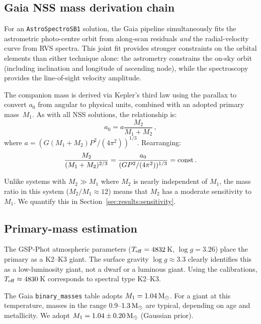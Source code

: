 \documentclass[usenatbib,fleqn]{mnras}
\newcommand{\Msun}{{\rm M}_\odot}
\begin{document}
\subsection{Gaia NSS mass derivation chain}
\label{sec:methods:nss}

For an \texttt{AstroSpectroSB1} solution, the Gaia pipeline
simultaneously fits the astrometric photo-centre orbit from
along-scan residuals \emph{and} the radial-velocity curve from
RVS spectra.  This joint fit provides stronger constraints on the
orbital elements than either technique alone: the astrometry
constrains the on-sky orbit (including inclination and longitude
of ascending node), while the spectroscopy provides the
line-of-sight velocity amplitude.

The companion mass is derived via Kepler's third law using the
parallax to convert $a_0$ from angular to physical units,
combined with an adopted primary mass~$M_1$.  As with all NSS
solutions, the relationship is:
\begin{equation}
a_0 = a \frac{M_2}{M_1 + M_2} \,,
\label{eq:a0}
\end{equation}
where $a = (G(M_1 + M_2) P^2 / (4\pi^2))^{1/3}$.  Rearranging:
\begin{equation}
\frac{M_2}{(M_1 + M_2)^{2/3}} =
  \frac{a_0}{(G P^2 / (4\pi^2))^{1/3}} = {\rm const} \,.
\label{eq:m2constraint}
\end{equation}

Unlike systems with $M_2 \gg M_1$ where $M_2$ is nearly
independent of $M_1$, the mass ratio in this system
($M_2/M_1 \approx 12$) means that $M_2$ has a moderate
sensitivity to $M_1$.  We quantify this in
Section~\ref{sec:results:sensitivity}.

\subsection{Primary-mass estimation}
\label{sec:methods:m1}

The GSP-Phot atmospheric parameters
($T_{\rm eff} = 4832$\,K, $\log g = 3.26$) place the primary as a
K2--K3 giant.  The surface gravity $\log g \approx 3.3$ clearly
identifies this as a low-luminosity giant, not a dwarf or a
luminous giant.  Using the \citet{PecautMamajek2013} calibrations,
$T_{\rm eff} \approx 4830$\,K corresponds to spectral type K2--K3.

The Gaia \texttt{binary\_masses} table adopts
$M_1 = 1.04\,\Msun$.  For a giant at this temperature, masses in
the range $0.9$--$1.3\,\Msun$ are typical, depending on age and
metallicity.  We adopt $M_1 = 1.04 \pm 0.20\,\Msun$ (Gaussian
prior).
\end{document}
